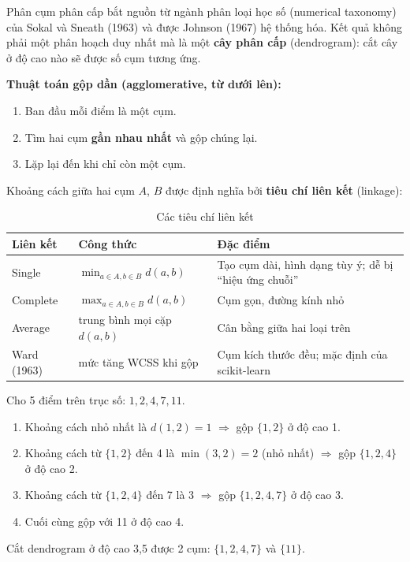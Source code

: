 Phân cụm phân cấp bắt nguồn từ ngành phân loại học số (numerical taxonomy) của Sokal và Sneath (1963) và được Johnson (1967) hệ thống hóa. Kết quả không phải một phân hoạch duy nhất mà là một \textbf{cây phân cấp} (dendrogram): cắt cây ở độ cao nào sẽ được số cụm tương ứng.

\noindent\textbf{Thuật toán gộp dần (agglomerative, từ dưới lên):}
\begin{enumerate}
    \item Ban đầu mỗi điểm là một cụm.
    \item Tìm hai cụm \textbf{gần nhau nhất} và gộp chúng lại.
    \item Lặp lại đến khi chỉ còn một cụm.
\end{enumerate}

Khoảng cách giữa hai cụm $A$, $B$ được định nghĩa bởi \textbf{tiêu chí liên kết} (linkage):
\begin{table}[H]
\centering
\begin{tabular}{|l|l|p{6cm}|}
\hline
\textbf{Liên kết} & \textbf{Công thức} & \textbf{Đặc điểm} \\
\hline
Single & $\min_{a \in A, b \in B} d(a, b)$ & Tạo cụm dài, hình dạng tùy ý; dễ bị ``hiệu ứng chuỗi'' \\ \hline
Complete & $\max_{a \in A, b \in B} d(a, b)$ & Cụm gọn, đường kính nhỏ \\ \hline
Average & trung bình mọi cặp $d(a, b)$ & Cân bằng giữa hai loại trên \\ \hline
Ward (1963) & mức tăng WCSS khi gộp & Cụm kích thước đều; mặc định của scikit-learn \\ \hline
\end{tabular}
\caption{Các tiêu chí liên kết}
\end{table}

\begin{example}
Cho 5 điểm trên trục số: $1, 2, 4, 7, 11$.
\begin{enumerate}
    \item Khoảng cách nhỏ nhất là $d(1, 2) = 1$ $\Rightarrow$ gộp $\{1, 2\}$ ở độ cao 1.
    \item Khoảng cách từ $\{1, 2\}$ đến 4 là $\min(3, 2) = 2$ (nhỏ nhất) $\Rightarrow$ gộp $\{1, 2, 4\}$ ở độ cao 2.
    \item Khoảng cách từ $\{1, 2, 4\}$ đến 7 là 3 $\Rightarrow$ gộp $\{1, 2, 4, 7\}$ ở độ cao 3.
    \item Cuối cùng gộp với 11 ở độ cao 4.
\end{enumerate}
Cắt dendrogram ở độ cao 3,5 được 2 cụm: $\{1, 2, 4, 7\}$ và $\{11\}$.
\end{example}

